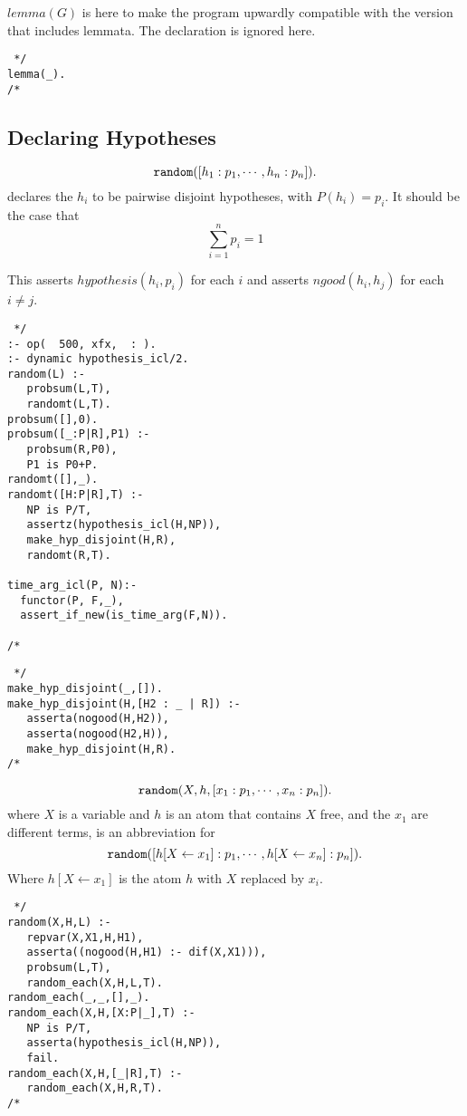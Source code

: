 \documentclass[11pt,fleqn]{article}
\begin{document}
$lemma(G)$ is here to make the program upwardly compatible with the
version that includes lemmata. The declaration is ignored here.

\begin{verbatim} */
lemma(_).
/* \end{verbatim}

\subsection{Declaring Hypotheses}

\[\hbox{\ttfamily random}([h_1:p_1,\cdots,h_n:p_n]).\]
declares the $h_i$ to be pairwise disjoint hypotheses, with $P(h_i)=p_i$.
It should be the case that 
\[\sum_{i=1}^n p_i = 1\]

This asserts $hypothesis(h_i,p_i)$ for each $i$ and asserts
$ngood(h_i,h_j)$ for each $i \neq j$.

\begin{verbatim} */
:- op(  500, xfx,  : ).
:- dynamic hypothesis_icl/2.
random(L) :-
   probsum(L,T),
   randomt(L,T).
probsum([],0).
probsum([_:P|R],P1) :-
   probsum(R,P0),
   P1 is P0+P.
randomt([],_).
randomt([H:P|R],T) :-
   NP is P/T,
   assertz(hypothesis_icl(H,NP)),
   make_hyp_disjoint(H,R),
   randomt(R,T).

time_arg_icl(P, N):- 
  functor(P, F,_),
  assert_if_new(is_time_arg(F,N)).
 
/* \end{verbatim}
\begin{verbatim} */
make_hyp_disjoint(_,[]).
make_hyp_disjoint(H,[H2 : _ | R]) :-
   asserta(nogood(H,H2)),
   asserta(nogood(H2,H)),
   make_hyp_disjoint(H,R).
/* \end{verbatim}

\[\hbox{\ttfamily random}(X,h,[x_1:p_1,\cdots,x_n:p_n]).\]
where $X$ is a variable and $h$ is an atom that contains $X$ free, and the $x_1$ are different terms, is an abbreviation for
\[\hbox{\ttfamily random}([h[X \leftarrow x_1]:p_1,\cdots,h[X \leftarrow x_n]:p_n]).\]
Where $h[X \leftarrow x_1]$ is the atom $h$ with $X$ replaced by $x_i$.
\begin{verbatim} */
random(X,H,L) :-
   repvar(X,X1,H,H1),
   asserta((nogood(H,H1) :- dif(X,X1))),
   probsum(L,T),
   random_each(X,H,L,T).
random_each(_,_,[],_).
random_each(X,H,[X:P|_],T) :-
   NP is P/T,
   asserta(hypothesis_icl(H,NP)),
   fail.
random_each(X,H,[_|R],T) :-
   random_each(X,H,R,T).
/* \end{verbatim}
\end{document}
